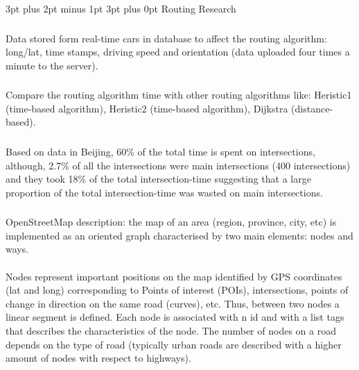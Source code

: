 \documentclass[12pt,a4paper]{article}
\makeatletter
\renewcommand\subsection{\@startsection {subsection}{1}{2mm} %
                               {3pt plus 2pt minus 1pt} %
                               {3pt plus 0pt} %
                               {\normalfont\bfseries}}
\makeatother
\begin{document}
\subsection{Routing Research}

\subsubsection{}
Data stored form real-time cars in database to affect the routing algorithm: long/lat, time stamps, driving speed and orientation (data uploaded four times a minute to the server). \cite{Zheng2018}

\subsubsection{}
Compare the routing algorithm time with other routing algorithms like: Heristic1 (time-based algorithm), Heristic2 (time-based algorithm), Dijkstra (distance-based). \cite{Zheng2018}

\subsubsection{}
Based on data in Beijing, 60\% of the total time is spent on intersections, although, 2.7\% of all the intersections were main intersections (400 intersections) and they took 18\% of the total intersection-time suggesting that a large proportion of the total intersection-time was wasted on main intersections. \cite{Liu}

\subsubsection{}
OpenStreetMap description: the map of an area (region, province, city, etc) is implemented as an oriented graph characterised by two main elements: nodes and ways.
\paragraph{}
Nodes represent important positions on the map identified by GPS coordinates (lat and long) corresponding to Points of interest (POIs), intersections, points of change in direction on the same road (curves), etc. Thus, between two nodes a linear segment is defined. Each node is associated with n id and with a list tags that describes the characteristics of the node. The number of nodes on a road depends on the type of road (typically urban roads are described with a higher amount of nodes with respect to highways).
\end{document}
